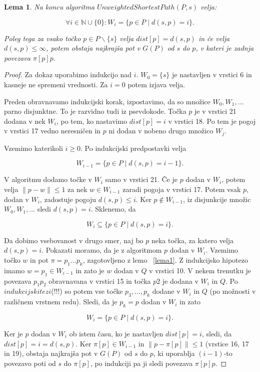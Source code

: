 \documentclass[a4paper, 12pt]{book}
\newcommand{\NN}{\ensuremath{\mathbb N}}  %
\newtheorem{lema}[izrek]{Lema}
\begin{document}
\begin{lema}
\label{lema2}
Na koncu algoritma $UnweightedShortestPath(P, s)$ velja:

\begin{equation}
\forall i \in \NN \cup \{0\}:  W_i = \{p\in P \mid d(s, p) = i\}.
\end{equation}

Poleg tega za vsako točko $p \in P \backslash \{s\}$ velja $dist[p] = d(s,p)$ in če velja $d(s,p) \le \infty$, potem obstaja najkrajša pot v $G(P)$ od $s$ do $p$, v kateri je zadnja povezava $\pi [p]p$.
\end{lema}

\begin{proof}
Za dokaz uporabimo indukcijo nad $i$. $W_0 = \{s\}$ je nastavljen v vrstici 6 in kasneje ne spremeni vrednosti. Za $i = 0$ potem izjava velja.

Preden obravnavamo indukcijski korak, izpostavimo, da so množice $W_0, W_1,...$ parno disjunktne. To je razvidno tudi iz psevdokode. Točka $p$  je v vrstici 21 dodana v nek $W_i$, po tem, ko nastavimo $dist[p] = i$ v vrstici 18. Po tem je pogoj v vrstici 17 vedno neresničen in $p$ ni dodan v nobeno drugo množico $W_j$.

Vzemimo katerikoli $i \ge 0$. Po indukcijski predpostavki velja

\begin{equation}
W_{i-1} = \{p \in P \mid d(s,p) = i - 1\}.
\end{equation}

V algoritmu dodamo točke v $W_i$ samo v vrstici 21. Če je $p$ dodan v $W_i$, potem velja $\|p - w\| \leq 1$ za nek $w \in W_{i-1}$ zaradi pogoja v vrstici 17. Potem vsak $p$, dodan v $W_i$, zadostuje pogoju $d(s,p) \leq i$. Ker $p \notin W_{i-1}$, iz disjunkcije množic $W_0, W_1,...$ sledi $d(s,p) = i$. Sklenemo, da

\begin{equation}
W_i \subseteq \{p \in P \mid d(s,p) = i\}.
\end{equation}

Da dobimo vsebovanost v drugo smer, naj bo $p$ neka točka, za katero velja $d(s,p) = i$. Pokazati moramo, da je z algoritmom $p$ dodan v $W_i$. Vzemimo točko $w$ in pot $\pi = p_1...p_k$, zagotovljeno z lemo ~\ref{lema1}. Z indukcijsko hipotezo imamo $w = p_1 \in W_{i-1}$ in zato je $w$ dodan v $Q$ v vrstici 10. V nekem trenutku je povezava $p_1p_2$ obravnavana v vrstici 15 in točka $p2$ je dodana v $W_i$ in $Q$. Po $indukcijski tezi$(!!!) so potem vse točke $p_3,...,p_k$ dodane v $W_i$ in $Q$ (po možnosti v različnem vrstnem redu). Sledi, da je $p_k = p$ dodan v $W_i$ in zato

\begin{equation}
W_i = \{p \in P \mid d(s,p) = i \}.
\end{equation}

Ker je $p$ dodan v $W_i$ ob istem času, ko je nastavljen $dist[p] = i$, sledi, da $dist[p] = i = d(s,p)$. Ker $\pi[p] \in W_{i-1}$ in $\|p - \pi[p] \| \leq 1$ (vrstice 16, 17 in 19), obstaja najkrajša pot v $G(P)$ od $s$ do $p$, ki uporablja $(i-1)$-to povezavo poti od $s$ do $\pi[p]$, po indukciji pa ji sledi povezava $\pi[p]p$.
\end{proof}
\end{document}
